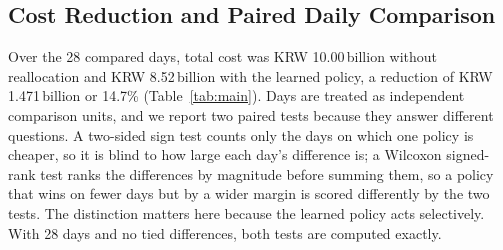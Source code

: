 \documentclass[a4paper]{llncs}
\begin{document}
\subsection{Cost Reduction and Paired Daily Comparison}
\label{sec:exp-paired}
Over the 28 compared days, total cost was KRW 10.00\,billion without
reallocation and KRW 8.52\,billion with the learned policy, a reduction of
KRW 1.471\,billion or 14.7\% (Table~\ref{tab:main}). Days are treated as
independent comparison units, and we report two paired tests because
they answer different questions. A two-sided sign test counts only the
days on which one policy is cheaper, so it is blind to how large each
day's difference is; a Wilcoxon signed-rank test ranks the differences
by magnitude before summing them, so a policy that wins on fewer days
but by a wider margin is scored differently by the two tests. The
distinction
matters here because the learned policy acts selectively. With 28 days
and no tied differences, both tests are computed exactly.
\end{document}
